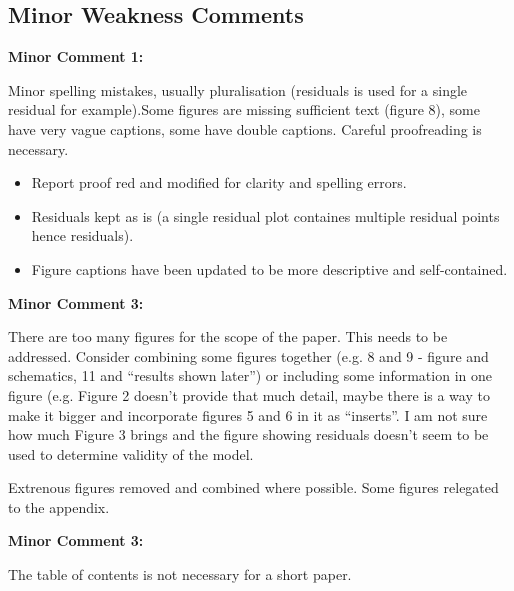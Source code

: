 \documentclass[%
 aip,
cp,  %
 amsmath,amssymb,
 reprint,%
]{revtex4-2}
\begin{document}
    \subsection{Minor Weakness Comments}

        \begin{mdframed} \textbf{Minor Comment 1:}

            Minor spelling mistakes, usually pluralisation (residuals is used for a single residual for example).Some figures are missing sufficient text (figure 8), some have very vague captions, some have double captions. Careful proofreading is necessary.
        \end{mdframed}
        {\color{red}
        
        \begin{itemize}
            \item Report proof red and modified for clarity and spelling errors. 
            \item Residuals kept as is (a single residual plot containes multiple residual points hence residuals). 
            \item Figure captions have been updated to be more descriptive and self-contained.
        \end{itemize}

        }
        \begin{mdframed} \textbf{Minor Comment 3:}

            There are too many figures for the scope of the paper. This needs to be addressed. Consider combining some figures together (e.g. 8 and 9 - figure and schematics, 11 and ``results shown later'') or including some information in one figure (e.g. Figure 2 doesn't provide that much detail, maybe there is a way to make it bigger and incorporate figures 5 and 6 in it as ``inserts''. I am not sure how much Figure 3 brings and the figure showing residuals doesn't seem to be used to determine validity of the model.
        \end{mdframed}
        {\color{red}
        
        Extrenous figures removed and combined where possible. Some figures relegated to the appendix. 

        }
        \begin{mdframed} \textbf{Minor Comment 3:}

            The table of contents is not necessary for a short paper.

        \end{mdframed}  
\end{document}
